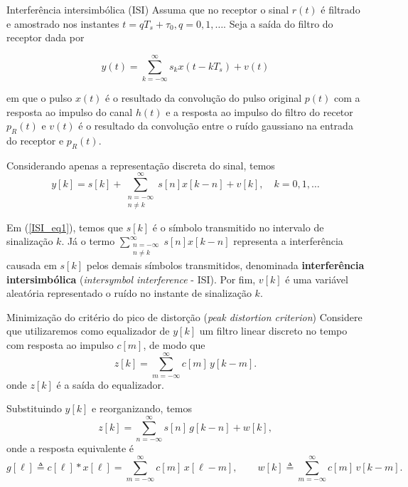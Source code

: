 \documentclass[
  ignorenonframetext,
]{beamer}
\begin{document}
\begin{frame}{Interferência intersimbólica (ISI)}
\label{interferuxeancia-intersimbuxf3lica-isi}
Assuma que no receptor o sinal \(r(t)\) é filtrado e amostrado nos
instantes \(t=qT_s + \tau_{0}, q=0, 1, \ldots\). Seja a saída do filtro
do receptor dada por

\begin{equation}
y(t)=\sum_{k=-\infty}^{\infty} s_k x(t-kT_s) + v(t)
\end{equation}

em que o pulso \(x(t)\) é o resultado da convolução do pulso original
\(p(t)\) com a resposta ao impulso do canal \(h(t)\) e a resposta ao
impulso do filtro do recetor \(p_{R}(t)\) e \(v(t)\) é o resultado da
convolução entre o ruído gaussiano na entrada do receptor e
\(p_{R}(t)\). 
\end{frame}

\begin{frame}
Considerando apenas a representação discreta do sinal,
temos \begin{equation}\label{ISI_eq1}
y[k]=s[k] + \sum_{\substack{n=-\infty \\ n \neq k}}^{\infty} s[n] x[k-n] + v[k], \quad k=0,1, \ldots
\end{equation}

Em (\ref{ISI_eq1}), temos que \(s[k]\) é o símbolo transmitido no
intervalo de sinalização \(k\). Já o termo
\(\sum_{\substack{n=-\infty \\ n \neq k}}^{\infty} s[n] x[k-n]\)
representa a interferência causada em \(s[k]\) pelos demais símbolos
transmitidos, denominada \textbf{interferência intersimbólica}
(\emph{intersymbol interference} - ISI). Por fim, \(v[k]\) é uma
variável aleatória representado o ruído no instante de sinalização
\(k\).

\end{frame}
\begin{frame}{Minimização do critério do pico de distorção (\emph{peak
distortion criterion})}
\label{minimizauxe7uxe3o-do-crituxe9rio-do-pico-de-distoruxe7uxe3o-peak-distortion-criterion}
Considere que utilizaremos como equalizador de \(y[k]\) um filtro linear
discreto no tempo com resposta ao impulso \(c[m]\), de modo que \[
z[k]=\sum_{m=-\infty}^{\infty} c[m]\,y[k-m].
\] onde \(z[k]\) é a saída do equalizador.

Substituindo \(y[k]\) e reorganizando, temos \[
z[k]=\sum_{n=-\infty}^{\infty} s[n]\,g[k-n] + w[k],
\] onde a resposta equivalente é \[
g[\ell]\triangleq c[\ell]\ast x[\ell] = \sum_{m=-\infty}^{\infty} c[m]\,x[\ell-m],
\qquad
w[k]\triangleq \sum_{m=-\infty}^{\infty} c[m]\,v[k-m].
\] 
\end{frame}
\end{document}
